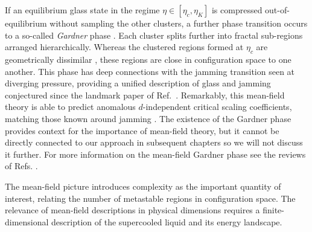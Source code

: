\documentclass[11pt,twoside]{report}
\begin{document}
If an equilibrium glass state in the regime $\eta \in [\eta_c, \eta_K]$ is compressed out-of-equilibrium without sampling the other clusters, a further phase transition occurs to a so-called \emph{Gardner} phase \cite{KurchanJPCB2013,CharbonneauNC2014,CharbonneauJSM2014}.
Each cluster splits further into fractal sub-regions arranged hierarchically.
Whereas the clustered regions formed at $\eta_c$ are geometrically dissimilar%
,
these regions are close in configuration space to one another.
This phase has deep connections with the jamming transition seen at diverging pressure, providing a unified description of glass and jamming conjectured since the landmark paper of Ref.\ \cite{LiuN1998}.
Remarkably, this mean-field theory is able to predict anomalous $d$-independent critical scaling coefficients, matching those known around jamming \cite{WyartPRL2012,LernerSM2013,DeGiuliPNAS2014}.
The existence of the Gardner phase provides context for the importance of mean-field theory, but it cannot be directly connected to our approach in subsequent chapters so we will not discuss it further.
For more information on the mean-field Gardner phase see the reviews of Refs. \cite{BerthierJCP2019,CharbonneauARCMP2017}.


The mean-field picture introduces complexity as the important quantity of interest, relating the number of metastable regions in configuration space.
The relevance of mean-field descriptions in physical dimensions requires a finite-dimensional description of the supercooled liquid and its energy landscape.


\end{document}
